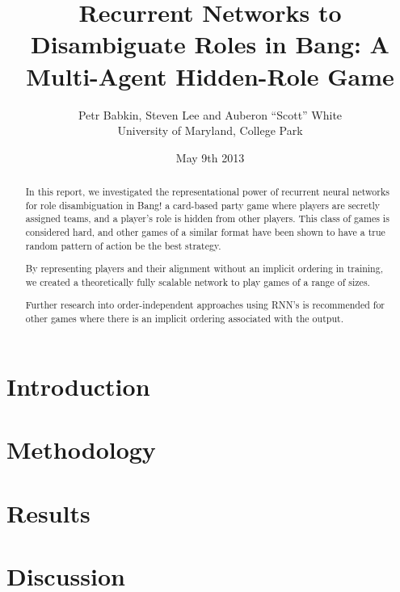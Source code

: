 \documentclass[12pt]{report}
\begin{document}
\title{Recurrent Networks to Disambiguate Roles in Bang: A Multi-Agent Hidden-Role Game}
\author{Petr Babkin, Steven Lee and Auberon ``Scott'' White\\ University of Maryland, College Park}
\date{May 9th 2013}
\maketitle

\begin{abstract}
In this report, we investigated the representational power of recurrent neural networks for role disambiguation in Bang! a card-based party game where players are secretly assigned teams, and a player's role is hidden from other players. This class of games is considered hard, and other games of a similar format have been shown to have a true random pattern of action be the best strategy.

By representing players and their alignment without an implicit ordering in training, we created a theoretically fully scalable network to play games of a range of sizes. 

Further research into order-independent approaches using RNN's is recommended for other games where there is an implicit ordering associated with the output.

\end{abstract}

\section{Introduction}
\label{sec:1}


\section{Methodology}
\label{sec:2}


\section{Results}
\label{sec:3}


\section{Discussion}
\label{sec:4}






\begin{thebibliography}{99}

\end{thebibliography}
\end{document}
